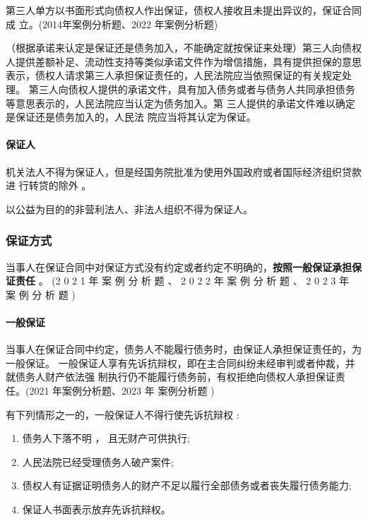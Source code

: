 \documentclass[UTF8,12pt]{ctexart}
\numberwithin{equation}{section} %
\numberwithin{figure}{section}
\numberwithin{table}{section}
\begin{document}
	第三人单方以书面形式向债权人作出保证，债权人接收且未提出异议的，保证合同成 立。(2014年案例分析题、2022 年案例分析题)
	
	（根据承诺来认定是保证还是债务加入，不能确定就按保证来处理）第三人向债权人提供差额补足、流动性支持等类似承诺文件作为增信措施，具有提供担保的意思表示，债权人请求第三人承担保证责任的，人民法院应当依照保证的有关规定处理。 第三人向债权人提供的承诺文件，具有加入债务或者与债务人共同承担债务等意思表示的，人民法院应当认定为债务加入。第 三人提供的承诺文件难以确定是保证还是债务加入的，人民法 院应当将其认定为保证。
	
	\paragraph{保证人}
	机关法人不得为保证人，但是经国务院批准为使用外国政府或者国际经济组织贷款进 行转贷的除外 。
	
	以公益为目的的非营利法人、非法人组织不得为保证人。
	
	\subsubsection{保证方式}
	当事人在保证合同中对保证方式没有约定或者约定不明确的，\textbf{按照一般保证承担保证责任} 。 (2 0 2 1 年 案 例 分 析 题 、 2 0 2 2 年 案 例 分 析 题 、 2 0 2 3 年 案 例 分 析 题 )
	
	\paragraph{一般保证} 当事人在保证合同中约定，债务人不能履行债务时，由保证人承担保证责任的，为 一般保证。 一般保证人享有先诉抗辩权，即在主合同纠纷未经审判或者仲裁，并就债务人财产依法强 制执行仍不能履行债务前，有权拒绝向债权人承担保证责任。(2021 年案例分析题、2023 年 案例分析题 )
	
	有下列情形之一的，一般保证人不得行使先诉抗辩权 :
	\begin{enumerate}
		\item 债务人下落不明 ， 且无财产可供执行;
		
		\item 人民法院已经受理债务人破产案件;
		
		\item 债权人有证据证明债务人的财产不足以履行全部债务或者丧失履行债务能力;
		
		\item 保证人书面表示放弃先诉抗辩权。
	\end{enumerate}
	
\end{document}
